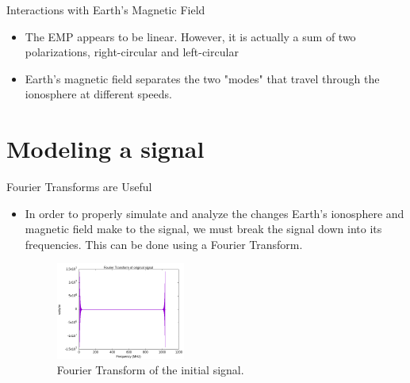 \documentclass[10pt, aspectratio=168]{beamer}
\begin{document}
    \begin{frame}{Interactions with Earth's Magnetic Field}
    \begin{itemize}
        \item \Large The EMP appears to be linear. However, it is actually a sum of two polarizations,
        right-circular and left-circular
        \item Earth's magnetic field separates the two "modes" that travel through the ionosphere at different speeds.
        \end{itemize}
    \end{frame}
    

\section{Modeling a signal}
    \begin{frame}{Fourier Transforms are Useful}
    \begin{itemize}
        \item In order to properly simulate and analyze the changes Earth's ionosphere and magnetic field make to the signal, we must break the signal down into its frequencies.
This can be done using a Fourier Transform.
\begin{figure}[h]
    \centering
    \includegraphics[width=0.4\textwidth]{fft_original_signal.png}
    \caption{Fourier Transform of the initial signal.}
    \label{fig:ft-original-signal}
\end{figure}

    \end{itemize}
    \end{frame}
\end{document}
